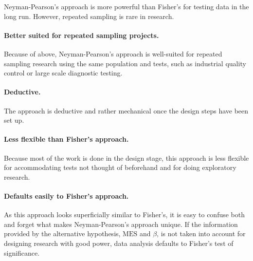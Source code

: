 \documentclass[
]{book}
\theoremstyle{definition}
\theoremstyle{definition}
\theoremstyle{definition}
\theoremstyle{definition}
\theoremstyle{remark}
\begin{document}
Neyman-Pearson's approach is more powerful than Fisher's for testing data in the long run. However, repeated sampling is rare in research.

\hypertarget{better-suited-for-repeated-sampling-projects.}{%
\paragraph*{Better suited for repeated sampling projects.}\label{better-suited-for-repeated-sampling-projects.}}

Because of above, Neyman-Pearson's approach is well-suited for repeated sampling research using the same population and tests, such as industrial quality control or large scale diagnostic testing.

\hypertarget{deductive.}{%
\paragraph*{Deductive.}\label{deductive.}}

The approach is deductive and rather mechanical once the design steps have been set up.

\hypertarget{less-flexible-than-fishers-approach.}{%
\paragraph*{Less flexible than Fisher's approach.}\label{less-flexible-than-fishers-approach.}}

Because most of the work is done in the design stage, this approach is less flexible for accommodating tests not thought of beforehand and for doing exploratory research.

\hypertarget{defaults-easily-to-fishers-approach.}{%
\paragraph*{Defaults easily to Fisher's approach.}\label{defaults-easily-to-fishers-approach.}}

As this approach looks superficially similar to Fisher's, it is easy to confuse both and forget what makes Neyman-Pearson's approach unique. If the information provided by the alternative hypothesis, \(\mbox{MES}\) and \(\beta\), is not taken into account for designing research with good power, data analysis defaults to Fisher's test of significance.
\end{document}

